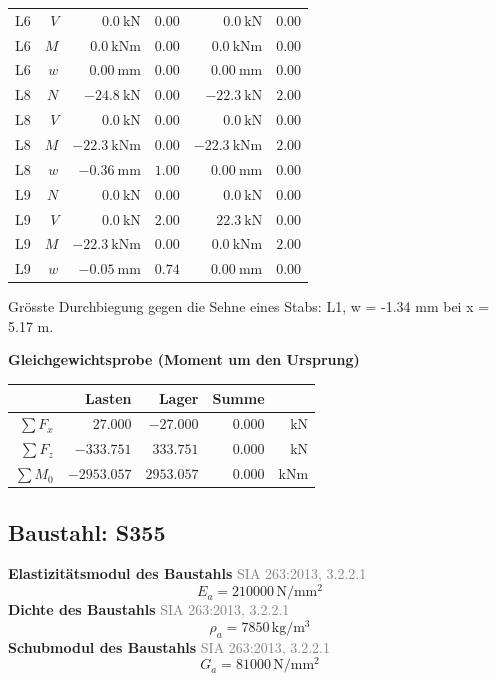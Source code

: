 \documentclass[11pt,a4paper]{article}
\newcommand{\normref}[1]{{\small\textcolor{gray}{#1}}}
\begin{document}
\begin{longtable}{rrrrrr}
L6 & $V$ & $0.0\ \mathrm{kN}$ & $0.00$ & $0.0\ \mathrm{kN}$ & $0.00$ \\
L6 & $M$ & $0.0\ \mathrm{kNm}$ & $0.00$ & $0.0\ \mathrm{kNm}$ & $0.00$ \\
L6 & $w$ & $0.00\ \mathrm{mm}$ & $0.00$ & $0.00\ \mathrm{mm}$ & $0.00$ \\
L8 & $N$ & $-24.8\ \mathrm{kN}$ & $0.00$ & $-22.3\ \mathrm{kN}$ & $2.00$ \\
L8 & $V$ & $0.0\ \mathrm{kN}$ & $0.00$ & $0.0\ \mathrm{kN}$ & $0.00$ \\
L8 & $M$ & $-22.3\ \mathrm{kNm}$ & $0.00$ & $-22.3\ \mathrm{kNm}$ & $2.00$ \\
L8 & $w$ & $-0.36\ \mathrm{mm}$ & $1.00$ & $0.00\ \mathrm{mm}$ & $0.00$ \\
L9 & $N$ & $0.0\ \mathrm{kN}$ & $0.00$ & $0.0\ \mathrm{kN}$ & $0.00$ \\
L9 & $V$ & $0.0\ \mathrm{kN}$ & $2.00$ & $22.3\ \mathrm{kN}$ & $0.00$ \\
L9 & $M$ & $-22.3\ \mathrm{kNm}$ & $0.00$ & $0.0\ \mathrm{kNm}$ & $2.00$ \\
L9 & $w$ & $-0.05\ \mathrm{mm}$ & $0.74$ & $0.00\ \mathrm{mm}$ & $0.00$ \\
\hline
\end{longtable}
Grösste Durchbiegung gegen die Sehne eines Stabs: L1, w = -1.34 mm bei x = 5.17 m.

\noindent\textbf{Gleichgewichtsprobe (Moment um den Ursprung)}
\begin{longtable}{rrrrr}
\hline
 & Lasten & Lager & Summe &  \\
\hline
\endhead
$\sum F_x$ & $27.000$ & $-27.000$ & $0.000$ & kN \\
$\sum F_z$ & $-333.751$ & $333.751$ & $0.000$ & kN \\
$\sum M_0$ & $-2953.057$ & $2953.057$ & $0.000$ & kNm \\
\hline
\end{longtable}
\subsection{Baustahl: S355}
\noindent\textbf{Elastizitätsmodul des Baustahls} \hfill \normref{SIA 263:2013, 3.2.2.1}
\begin{equation*}
E_a = 210000\,\mathrm{N}/\mathrm{mm}^{2}
\end{equation*}
\noindent\textbf{Dichte des Baustahls} \hfill \normref{SIA 263:2013, 3.2.2.1}
\begin{equation*}
\rho_a = 7850\,\mathrm{kg}/\mathrm{m}^{3}
\end{equation*}
\noindent\textbf{Schubmodul des Baustahls} \hfill \normref{SIA 263:2013, 3.2.2.1}
\begin{equation*}
G_a = 81000\,\mathrm{N}/\mathrm{mm}^{2}
\end{equation*}
\end{document}
